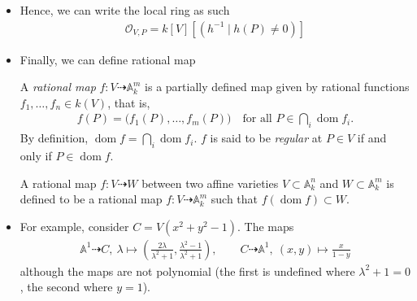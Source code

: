 \documentclass[8pt]{beamer}
\newcommand{\OO}{\mathcal{O}}
\newcommand{\A}{\mathbb{A}}
\theoremstyle{definition}
\begin{document}
    \begin{frame}
        \begin{itemize}
            
            \item Hence, we can write the local ring as such 
            \begin{align*}
                \OO_{V, P} = k[V][(h^{-1} \hspace{3pt} | \hspace{3pt} h(P) \neq 0)]
            \end{align*}
            \item Finally, we can define rational map 
            \begin{definition}
                A \emph{rational map} $f \colon V \dashrightarrow \mathbb{A}^m_k$ is a partially defined map given by rational functions $f_1, \dots, f_n \in k(V)$, that is,
                \begin{align*}
                    f(P) = \bigl(f_1(P), \dots, f_m(P)\bigr) \quad \text{for all } P \in \bigcap_i \operatorname{dom} f_i.
                \end{align*}
                By definition, $\operatorname{dom} f = \bigcap_i \operatorname{dom} f_i$. $f$ is said to be \emph{regular} at $P \in V$ if and only if $P \in \operatorname{dom} f$.

                A rational map $f \colon V \dashrightarrow W$ between two affine varieties $V \subset \mathbb{A}^n_k$ and $W \subset \mathbb{A}^m_k$ is defined to be a rational map $f \colon V \dashrightarrow \mathbb{A}^m_k$ such that $f(\operatorname{dom} f) \subset W$.
            \end{definition}
        \end{itemize}
        
    \end{frame}

    \begin{frame}
        \begin{itemize}
            \item For example, consider $C = V(x^2 + y^2 - 1)$. The maps
            \begin{align*}
                \A^1 \dashrightarrow C,\ \lambda \mapsto \left(\tfrac{2\lambda}{\lambda^2+1}, \tfrac{\lambda^2-1}{\lambda^2+1}\right), \qquad
                C \dashrightarrow \A^1,\ (x,y) \mapsto \tfrac{x}{1-y}
            \end{align*}
            although the maps are not polynomial (the first is undefined where $\lambda^2 + 1 = 0$, the second where $y = 1$).
        \end{itemize}
        
    \end{frame}
\end{document}
